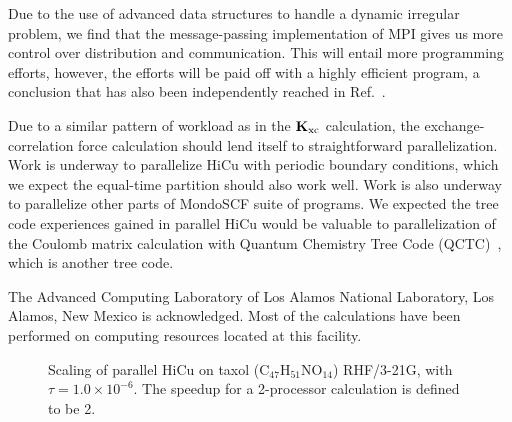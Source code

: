 \documentclass[preprint]{revtex4}
\newcommand{\Kxc}{{\bf K}_{\mathrm{xc}}}
\begin{document}
Due to the use of advanced data structures to handle 
a dynamic irregular problem, we find
that the message-passing implementation of MPI gives us more control over 
distribution and communication. 
This will entail more programming efforts, however,
the efforts will be paid off with a highly efficient program, a conclusion
that has also been independently reached in Ref.~\cite{Warren95b}.

Due to a similar pattern of workload as in the $\Kxc$ calculation, the
exchange-correlation force calculation should lend itself to
straightforward parallelization.  Work is underway to parallelize HiCu
with periodic boundary conditions, which we expect
the equal-time partition should also work well.
Work is also underway to parallelize other parts of MondoSCF suite of
programs.  We expected the tree code experiences gained in parallel
HiCu would be valuable to parallelization of the Coulomb matrix
calculation with Quantum Chemistry Tree 
Code (QCTC)~\cite{Challacombe97,MChallacombe96,Challacombe96B}, which is another tree
code.

\begin{acknowledgments}
The Advanced Computing Laboratory of Los Alamos National Laboratory,
Los Alamos, New Mexico is acknowledged. Most of the calculations have
been performed on computing resources located at this facility.
\end{acknowledgments}

 

\begin{figure}[t]
\caption{Scaling of parallel HiCu on taxol (C$_{47}$H$_{51}$NO$_{14}$)
RHF/3-21G, with $\tau = 1.0 \times 10^{-6}$. The speedup for a
2-processor calculation is defined to be 2.}\label{fig:taxol}
\end{figure}
\end{document}
